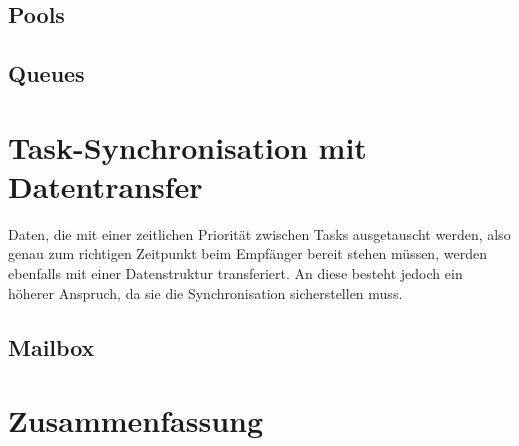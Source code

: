 \documentclass{llncs}
\begin{document}
\subsection{Pools}
\subsection{Queues}
\section{Task-Synchronisation mit Datentransfer}
Daten, die mit einer zeitlichen Priorität zwischen Tasks ausgetauscht werden, also genau zum richtigen Zeitpunkt beim Empfänger bereit stehen müssen, werden ebenfalls mit einer Datenstruktur transferiert. An diese besteht jedoch ein höherer Anspruch, da sie die Synchronisation sicherstellen muss.
\subsection{Mailbox}
\section{Zusammenfassung}

\printbibliography
\end{document}
